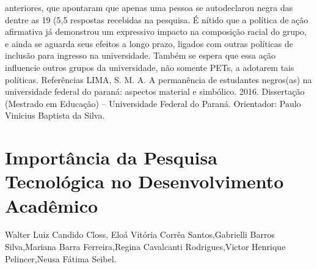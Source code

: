 anteriores, que apontaram que apenas uma pessoa se autodeclarou negra das dentre as 19 (5,5%
respostas recebidas na pesquisa. É nítido que a política de ação afirmativa já demonstrou um
expressivo impacto na composição racial do grupo, e ainda se aguarda seus efeitos a longo prazo,
ligados com outras políticas de inclusão para ingresso na universidade. Também se espera que
essa ação influencie outros grupos da universidade, não somente PETs, a adotarem tais políticas.
Referências
LIMA, S. M. A. A permanência de estudantes negros(as) na universidade federal do
paraná: aspectos material e simbólico. 2016. Dissertação (Mestrado em Educação) –
Universidade Federal do Paraná. Orientador: Paulo Vinicius Baptista da Silva.



\section{Importância da Pesquisa Tecnológica no Desenvolvimento Acadêmico}

Walter Luiz Candido Closs, Eloá Vitória Corrêa Santos,Gabrielli Barros Silva,Mariana Barra Ferreira,Regina Cavalcanti Rodrigues,Victor Henrique Pelincer,Neusa Fátima Seibel.

